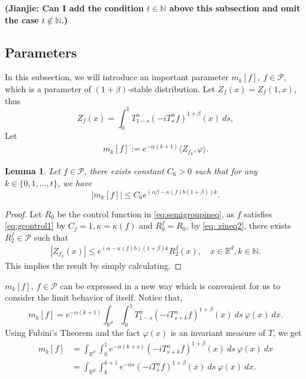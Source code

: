 \documentclass[12pt,oneside,english]{amsart}
\theoremstyle{plain}
\newtheorem{lem}[thm]{Lemma}
\theoremstyle{definition}
\numberwithin{equation}{section}
\begin{document}
{\bf (Jianjie: Can I add the condition $t\in \mathbb{N}$ above this subsection and omit the case $t \notin \mathbb{N}$.)}
\subsection{Parameters}
 In this subsection, we will introduce an important parameter $m_k[f],~f\in\mathcal{P}$, which is a parameter of $(1+\beta)$-stable distribution. Let $Z_f(x)=Z_f(1,x)$, thus
 $$Z_f(x)=\int_0^1 T^{\alpha}_{1-s}(-iT_s^{\alpha}f)^{1+\beta}(x)~ds,$$
 Let
 \begin{align}\label{parameter_mk}
      m_k[f]:=e^{-\alpha(k+1)}\langle Z_{f_k},\varphi\rangle.
 \end{align}
\begin{lem}\label{mgineq1}
Let $f\in\mathcal{P}$, there exists constant $C_6>0$ such that for any $k\in \{0,1,...,t\}$, we have
$$|m_k[f]|\leq C_6 e^{(\alpha\beta-\kappa(f)b(1+\beta))k}.$$
\end{lem}
\begin{proof}
Let $R_0$ be the control function in \eqref{eq:semigroupineq}, as $f$ satisfies \eqref{eq:gcontrol1} by $C_f=1, \kappa=\kappa(f)$ and $R_0^f=R_0$, by \eqref{eq: zineq2}, there exists $R_2^f\in \mathcal{P}$ such that
\begin{align}
    |Z_{f_k}(x)|\leq e^{(\alpha-\kappa(f)b)(1+\beta)k}R_2^f(x), \quad x\in \mathbb{R}^d, k\in\mathbb{N}.
\end{align}
This implies the result by simply calculating.
\end{proof}

$m_k[f],~f\in \mathcal{P}$ can be expressed in a new way which is convenient for us to consider the limit behavior of itself. Notice that,
$$m_k[f]=e^{-\alpha(k+1)}\int_{\mathbb{R}^d}\int_0^1 T_{1-s}^{\alpha}(-iT_{s+k}^{\alpha}f)^{1+\beta}(x)~ds~\varphi(x)~dx.$$
Using Fubini's Theorem and the fact $\varphi(x)$ is an invariant measure of $T$, we get
\begin{align}
    m_k[f]&=\int_{\mathbb{R}^d}\int_0^1 e^{-\alpha(k+s)}(-iT_{s+k}^{\alpha}f)^{1+\beta}(x)~ds~\varphi(x)~dx\nonumber\\
    &=\int_{\mathbb{R}^d}\int_k^{k+1} e^{-\alpha s}(-iT_{s}^{\alpha}f)^{1+\beta}(x)~ds~\varphi(x)~dx.\label{mkeq}
\end{align}
\end{document}
